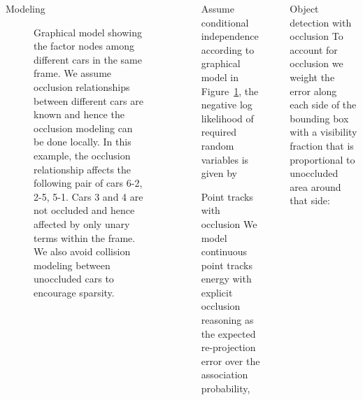 \documentclass[final]{beamer}
\newlength{\sepwid}
\newlength{\onecolwid}
\begin{document}
\begin{frame}[t]
\begin{columns}[t]
\begin{column}{\onecolwid}
\begin{block}{Modeling}
        \begin{figure}
          \centering
          \caption{Graphical model showing the factor nodes among different
            cars in the same frame. We assume occlusion relationships between
            different cars are known and hence the occlusion modeling can be done
            locally. In this example, the occlusion relationship affects the
            following pair of cars 6-2, 2-5, 5-1. Cars 3 and 4 are not occluded
            and hence affected by only unary terms within the frame. We also avoid 
            collision modeling between unoccluded cars to encourage sparsity.
          }
          \label{fig:graphmodel}
        \end{figure}

      \end{block}
    \end{column}

  \begin{column}{\sepwid}\end{column}			%

      
    \begin{column}{\onecolwid}
        \begin{figure}
          \centering
        \end{figure}

        Assume conditional independence according to graphical model in
        Figure~\ref{fig:graphmodel}, the negative log likelihood of required
        random variables is given by
      \begin{block}{Point tracks with occlusion}
        We model continuous point tracks energy with explicit occlusion reasoning as
        the expected re-projection error over the association probability,


      \end{block}

    \end{column}

  \begin{column}{\sepwid}\end{column}			%

    \begin{column}{\onecolwid}

      \begin{block}{Object detection with occlusion}
        To account for occlusion we weight the error along each side of the
        bounding box with a visibility fraction that is proportional to
        unoccluded area around that side:
        

\end{block}
\end{column}
\end{columns}
\end{frame}
\end{document}
